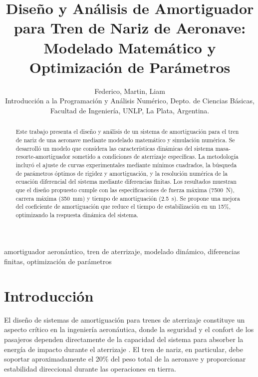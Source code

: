 \documentclass[journal]{IEEEtran}
\begin{document}
\title{Diseño y Análisis de Amortiguador para Tren de Nariz de Aeronave: Modelado Matemático y Optimización de Parámetros
}
\author{Federico, Martin, Liam  \\
Introducción a la Programación y Análisis Numérico, Depto. de Ciencias Básicas, Facultad de Ingeniería, UNLP, La Plata, Argentina.}
\maketitle

\begin{abstract}
Este trabajo presenta el diseño y análisis de un sistema de amortiguación para el tren de nariz de una aeronave mediante modelado matemático y simulación numérica. Se desarrolló un modelo que considera las características dinámicas del sistema masa-resorte-amortiguador sometido a condiciones de aterrizaje específicas. La metodología incluyó el ajuste de curvas experimentales mediante mínimos cuadrados, la búsqueda de parámetros óptimos de rigidez y amortiguación, y la resolución numérica de la ecuación diferencial del sistema mediante diferencias finitas. Los resultados muestran que el diseño propuesto cumple con las especificaciones de fuerza máxima (\SI{7500}{\newton}), carrera máxima (\SI{350}{\milli\meter}) y tiempo de amortiguación (\SI{2.5}{\second}). Se propone una mejora del coeficiente de amortiguación que reduce el tiempo de estabilización en un 15\%, optimizando la respuesta dinámica del sistema.
\end{abstract}

\begin{IEEEkeywords}
amortiguador aeronáutico, tren de aterrizaje, modelado dinámico, diferencias finitas, optimización de parámetros
\end{IEEEkeywords}

\section{Introducción}

El diseño de sistemas de amortiguación para trenes de aterrizaje constituye un aspecto crítico en la ingeniería aeronáutica, donde la seguridad y el confort de los pasajeros dependen directamente de la capacidad del sistema para absorber la energía de impacto durante el aterrizaje \cite{currey2006aircraft}. El tren de nariz, en particular, debe soportar aproximadamente el 20\% del peso total de la aeronave y proporcionar estabilidad direccional durante las operaciones en tierra.
\end{document}
